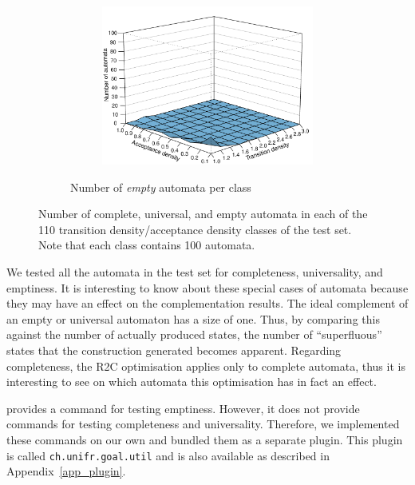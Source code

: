 \begin{figure}[htb!]
  \begin{subfigure}{\textwidth}
    \begin{subtable}{0.47\textwidth}
    
    \end{subtable}
    \hfill
    \begin{subfigure}{0.52\textwidth}
    \includegraphics[width=\textwidth]{../results/figures/testset/empt.persp.pdf}
    \end{subfigure}
  \caption{Number of \textit{empty} automata per class}
  \end{subfigure}
\caption{Number of complete, universal, and empty automata in each of the 110 transition density/acceptance density classes of the \goal{} test set. Note that each class contains 100 automata.}
\label{testset_analysis}
\end{figure}
\tablestyle  %

We tested all the automata in the \goal{} test set for completeness, universality, and emptiness. It is interesting to know about these special cases of automata because they may have an effect on the complementation results. The ideal complement of an empty or universal automaton has a size of one. Thus, by comparing this against the number of actually produced states, the number of ``superfluous'' states that the construction generated becomes apparent. Regarding completeness, the R2C optimisation applies only to complete automata, thus it is interesting to see on which automata this optimisation has in fact an effect.

\goal{} provides a command for testing emptiness. However, it does not provide commands for testing completeness and universality. Therefore, we implemented these commands on our own and bundled them as a separate \goal{} plugin. This plugin is called \texttt{ch.unifr.goal.util} and is also available as described in Appendix~\ref{app_plugin}.

